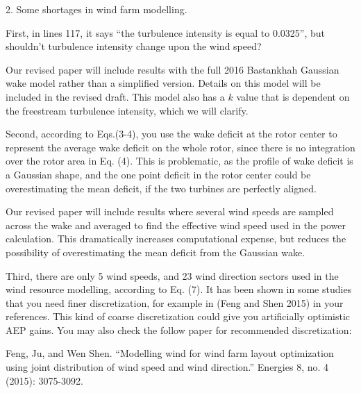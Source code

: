 \documentclass[12pt]{report}
\begin{document}
\color{black}
\bigskip 

2. Some shortages in wind farm modelling. 

First, in lines 117, it says ``the turbulence intensity is equal to 0.0325'', but shouldn’t turbulence intensity change upon the wind speed? 

\bigskip
\color{blue}

Our revised paper will include results with the full 2016 Bastankhah Gaussian wake model rather than a simplified version. Details on this model will be included in the revised draft. This model also has a $k$ value that is dependent on the freestream turbulence intensity, which we will clarify.

\color{black}
\bigskip

Second, according to Eqs.(3-4), you use the wake deficit at the rotor center to represent the average wake deficit on the whole rotor, since there is no integration over the rotor area in Eq. (4). This is problematic, as the profile of wake deficit is a Gaussian shape, and the one point deficit in the rotor center could be overestimating the mean deficit, if the two turbines are perfectly aligned. 

\bigskip
\color{blue}

Our revised paper will include results where several wind speeds are sampled across the wake and averaged to find the effective wind speed used in the power calculation. This dramatically increases computational expense, but reduces the possibility of overestimating the mean deficit from the Gaussian wake.

\color{black}
\bigskip

Third, there are only 5 wind speeds, and 23 wind direction sectors used in the wind resource modelling, according to Eq. (7). It has been shown in some studies that you need finer discretization, for example in (Feng and Shen 2015) in your references. This kind of coarse discretization could give you artificially optimistic AEP gains. You may also check the follow paper for recommended discretization: 

Feng, Ju, and Wen Shen. ``Modelling wind for wind farm layout optimization using joint distribution of wind speed and wind direction.'' Energies 8, no. 4 (2015): 3075-3092. 
\end{document}
